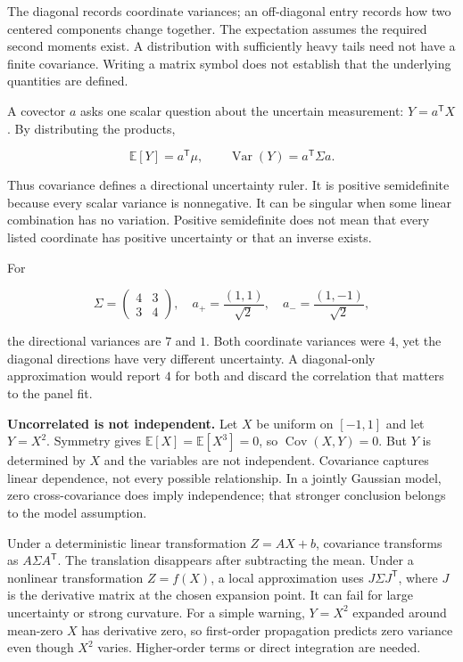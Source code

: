 The diagonal records coordinate variances; an off-diagonal entry records how two centered components change together. The expectation assumes the required second moments exist. A distribution with sufficiently heavy tails need not have a finite covariance. Writing a matrix symbol does not establish that the underlying quantities are defined.

A covector \(a\) asks one scalar question about the uncertain measurement: \(Y=a^{\mathsf T}X\). By distributing the products,

\[
\mathbb E[Y]=a^{\mathsf T}\mu,\qquad
\operatorname{Var}(Y)=a^{\mathsf T}\Sigma a.
\]

Thus covariance defines a directional uncertainty ruler. It is positive semidefinite because every scalar variance is nonnegative. It can be singular when some linear combination has no variation. Positive semidefinite does not mean that every listed coordinate has positive uncertainty or that an inverse exists.

For

\[
\Sigma=\begin{pmatrix}4&3\\3&4\end{pmatrix},
\quad a_+=\frac{(1,1)}{\sqrt2},\quad
a_-=\frac{(1,-1)}{\sqrt2},
\]

the directional variances are \(7\) and \(1\). Both coordinate variances were \(4\), yet the diagonal directions have very different uncertainty. A diagonal-only approximation would report \(4\) for both and discard the correlation that matters to the panel fit.

\textbf{Uncorrelated is not independent.} Let \(X\) be uniform on \([-1,1]\) and let \(Y=X^2\). Symmetry gives \(\mathbb E[X]=\mathbb E[X^3]=0\), so \(\operatorname{Cov}(X,Y)=0\). But \(Y\) is determined by \(X\) and the variables are not independent. Covariance captures linear dependence, not every possible relationship. In a jointly Gaussian model, zero cross-covariance does imply independence; that stronger conclusion belongs to the model assumption.

Under a deterministic linear transformation \(Z=AX+b\), covariance transforms as \(A\Sigma A^{\mathsf T}\). The translation disappears after subtracting the mean. Under a nonlinear transformation \(Z=f(X)\), a local approximation uses \(J\Sigma J^{\mathsf T}\), where \(J\) is the derivative matrix at the chosen expansion point. It can fail for large uncertainty or strong curvature. For a simple warning, \(Y=X^2\) expanded around mean-zero \(X\) has derivative zero, so first-order propagation predicts zero variance even though \(X^2\) varies. Higher-order terms or direct integration are needed.

